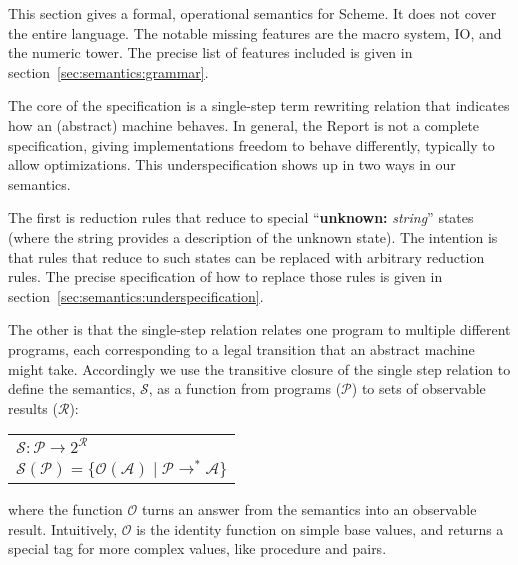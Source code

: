 

This section gives a formal, operational semantics for Scheme. It does not cover the entire language. The notable missing features are the macro system, IO, and the numeric tower. The precise list of features included is given in section~\ref{sec:semantics:grammar}.

The core of the specification is a single-step term rewriting relation that indicates how an (abstract) machine behaves. In general, the Report is not a complete specification, giving implementations freedom to behave differently, typically to allow optimizations. This underspecification shows up in two ways in our semantics. 

The first is reduction rules that reduce to special ``\textbf{unknown:} \textit{string}'' states (where the string provides a description of the unknown state). The intention is that rules that reduce to such states can be replaced with arbitrary reduction rules. The precise specification of how to replace those rules is given in section~\ref{sec:semantics:underspecification}.

The other is that the single-step relation relates one program to multiple different programs, each corresponding to a legal transition that an abstract machine might take. Accordingly we use the transitive closure of the single step relation to define the semantics, $\mathcal{S}$, as a function from programs ($\mathcal{P}$) to sets of observable results ($\mathcal{R}$):
\begin{center}
\begin{tabular}{l}
$\mathcal{S} : \mathcal{P} \longrightarrow 2^{\mathcal{R}}$ \\
$\mathcal{S}(\mathcal{P}) = \{ \mathscr{O}(\mathcal{A}) \mid \mathcal{P} \rightarrow^* \mathcal{A} \}$
\end{tabular}
\end{center}
where the function $\mathscr{O}$ turns an answer from the semantics into an observable result. Intuitively, $\mathscr{O}$ is the identity function on simple base values, and returns a special tag for more complex values, like procedure and pairs.

